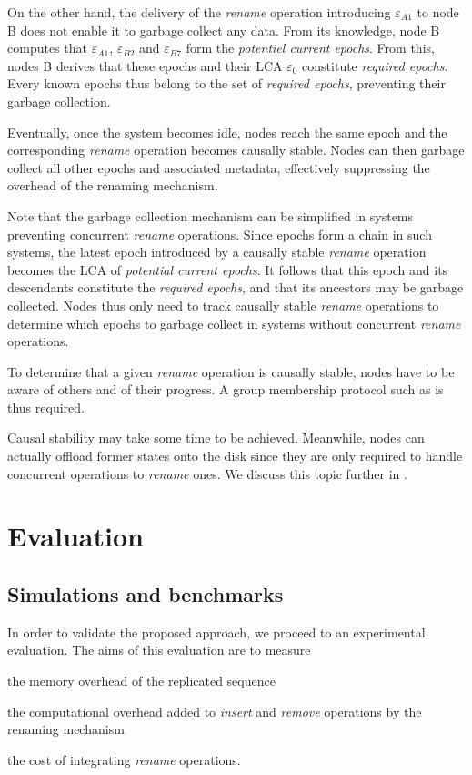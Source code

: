 \documentclass[10pt,journal,compsoc]{IEEEtran}
\newcommand{\epoch}[1]{$\varepsilon_{#1}$}
\begin{document}
On the other hand, the delivery of the \emph{rename} operation introducing \epoch{A1} to node B does not enable it to garbage collect any data.
From its knowledge, node B computes that \epoch{A1}, \epoch{B2} and \epoch{B7} form the \emph{potentiel current epochs}.
From this, nodes B derives that these epochs and their \ac{LCA} \epoch{0} constitute \emph{required epochs}.
Every known epochs thus belong to the set of \emph{required epochs}, preventing their garbage collection.

Eventually, once the system becomes idle, nodes reach the same epoch and the corresponding \emph{rename} operation becomes causally stable.
Nodes can then garbage collect all other epochs and associated metadata, effectively suppressing the overhead of the renaming mechanism.

Note that the garbage collection mechanism can be simplified in systems preventing concurrent \emph{rename} operations.
Since epochs form a chain in such systems, the latest epoch introduced by a causally stable \emph{rename} operation becomes the \ac{LCA} of \emph{potential current epochs}.
It follows that this epoch and its descendants constitute the \emph{required epochs}, and that its ancestors may be garbage collected.
Nodes thus only need to track causally stable \emph{rename} operations to determine which epochs to garbage collect in systems without concurrent \emph{rename} operations.

To determine that a given \emph{rename} operation is causally stable, nodes have to be aware of others and of their progress.
A group membership protocol such as \cite{swim2002,lifeguard2018} is thus required.

Causal stability may take some time to be achieved.
Meanwhile, nodes can actually offload former states onto the disk since they are only required to handle concurrent operations to \emph{rename} ones.
We discuss this topic further in .

\section{Evaluation}

\label{sec:evaluation}

\subsection{Simulations and benchmarks}

In order to validate the proposed approach, we proceed to an experimental evaluation.
The aims of this evaluation are to measure
\begin{enumerate*}[label=(\roman*)]
    \item the memory overhead of the replicated sequence
    \item the computational overhead added to \emph{insert} and \emph{remove} operations by the renaming mechanism
    \item the cost of integrating \emph{rename} operations.
\end{enumerate*}
\end{document}
